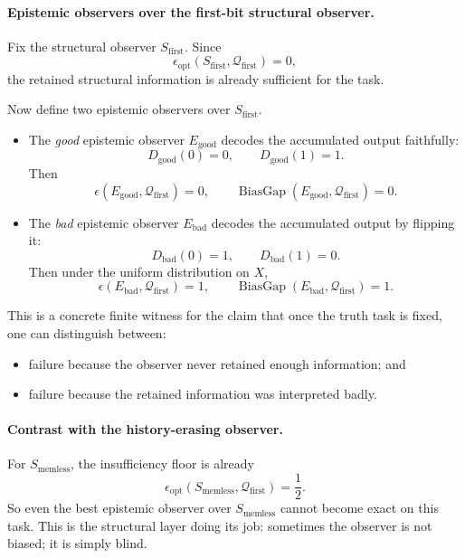 \documentclass[11pt,twoside]{article}
\theoremstyle{definition}
\newcommand{\good}{\mathrm{good}}
\newcommand{\bad}{\mathrm{bad}}
\DeclareMathOperator{\BiasGap}{BiasGap}
\begin{document}
\paragraph{Epistemic observers over the first-bit structural observer.}
Fix the structural observer \(S_{\mathrm{first}}\). Since
\[
  \epsilon_{\mathrm{opt}}(S_{\mathrm{first}},\mathcal{Q}_{\mathrm{first}})=0,
\]
the retained structural information is already sufficient for the task.

Now define two epistemic observers over \(S_{\mathrm{first}}\).

\begin{itemize}[leftmargin=*]
  \item The \emph{good} epistemic observer \(E_{\good}\) decodes the accumulated output faithfully:
        \[
          D_{\good}(0)=0,
          \qquad
          D_{\good}(1)=1.
        \]
        Then
        \[
          \epsilon(E_{\good},\mathcal{Q}_{\mathrm{first}})=0,
          \qquad
          \BiasGap(E_{\good},\mathcal{Q}_{\mathrm{first}})=0.
        \]

  \item The \emph{bad} epistemic observer \(E_{\bad}\) decodes the accumulated output by flipping it:
        \[
          D_{\bad}(0)=1,
          \qquad
          D_{\bad}(1)=0.
        \]
        Then under the uniform distribution on \(X\),
        \[
          \epsilon(E_{\bad},\mathcal{Q}_{\mathrm{first}})=1,
          \qquad
          \BiasGap(E_{\bad},\mathcal{Q}_{\mathrm{first}})=1.
        \]
\end{itemize}

This is a concrete finite witness for the claim that once the truth task is fixed, one can distinguish between:
\begin{itemize}[leftmargin=*]
  \item failure because the observer never retained enough information; and
  \item failure because the retained information was interpreted badly.
\end{itemize}

\paragraph{Contrast with the history-erasing observer.}
For \(S_{\mathrm{memless}}\), the insufficiency floor is already
\[
  \epsilon_{\mathrm{opt}}(S_{\mathrm{memless}},
  \mathcal{Q}_{\mathrm{first}})=\frac12.
\]
So even the best epistemic observer over \(S_{\mathrm{memless}}\) cannot become exact on this task. This is the structural layer doing its job: sometimes the observer is not biased; it is simply blind.
\end{document}
